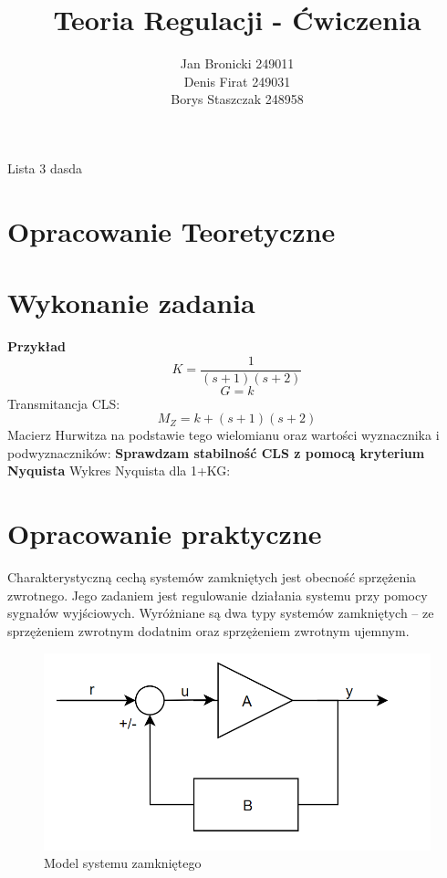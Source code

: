 \documentclass{article}
\title{Teoria Regulacji - Ćwiczenia}
\author{Jan Bronicki 249011 \\
        Denis Firat 249031  \\
        Borys Staszczak 248958 }
\date{}
\begin{document}
\maketitle
\begin{center}
    Lista 3 dasda
\end{center}

\section{Opracowanie Teoretyczne}

\section{Wykonanie zadania}
\textbf{Przykład }
$$K=\frac{1}{\left(s + 1\right) \left(s + 2\right)}$$
$$G=k$$
Transmitancja CLS:
$$M_Z=k + \left(s + 1\right) \left(s + 2\right)$$
Macierz Hurwitza na podstawie tego wielomianu oraz wartości wyznacznika i podwyznaczników:      
\textbf{Sprawdzam stabilność CLS z pomocą kryterium Nyquista}\newline
Wykres Nyquista dla 1+KG:
\section{Opracowanie praktyczne}

Charakterystyczną cechą systemów zamkniętych jest obecność sprzężenia zwrotnego. 
Jego zadaniem jest regulowanie działania systemu przy pomocy sygnałów wyjściowych. 
Wyróżniane są dwa typy systemów zamkniętych -- ze sprzężeniem zwrotnym dodatnim oraz sprzężeniem zwrotnym ujemnym.

\begin{figure}[h!]
\centering
\includegraphics[scale=0.4]{feedback.png}
\caption{Model systemu zamkniętego}
\label{fig:model}
\end{figure}
\end{document}
